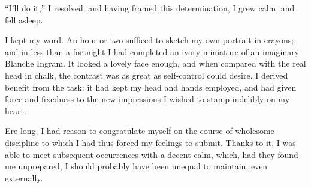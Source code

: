 \enquote{I'll do it,} I resolved: and having framed this determination,
I grew calm, and fell asleep.

I kept my word.  An hour or two sufficed to sketch my own portrait in
crayons; and in less than a fortnight I had completed an ivory miniature
of an imaginary Blanche Ingram.  It looked a lovely face enough, and
when compared with the real head in chalk, the contrast was as great as
self-control could desire.  I derived benefit from the task: it had kept
my head and hands employed, and had given force and fixedness to the new
impressions I wished to stamp indelibly on my heart.

Ere long, I had reason to congratulate myself on the course of wholesome
discipline to which I had thus forced my feelings to submit.  Thanks to
it, I was able to meet subsequent occurrences with a decent calm, which,
had they found me unprepared, I should probably have been unequal to
maintain, even externally.
